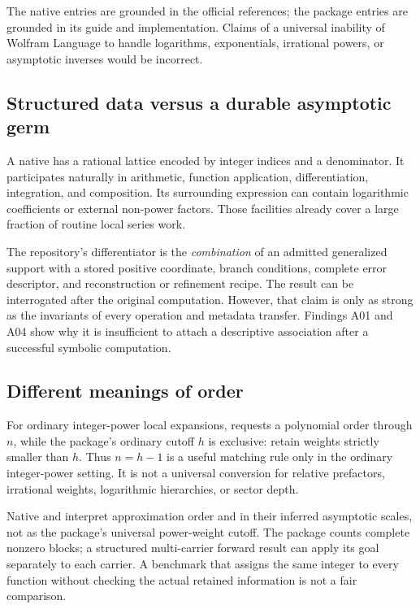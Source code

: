The native entries are grounded in the official references; the package entries are grounded in its guide and implementation. Claims of a universal inability of Wolfram Language to handle logarithms, exponentials, irrational powers, or asymptotic inverses would be incorrect.\cite{wl-series,wl-seriesdata,wl-inverse,wl-compose,wl-asymptotic,wl-solve,wl-discrete,guide,core,native,gamma,certificates}

\subsection{Structured data versus a durable asymptotic germ}
A native  has a rational lattice encoded by integer indices and a denominator. It participates naturally in arithmetic, function application, differentiation, integration, and composition. Its surrounding expression can contain logarithmic coefficients or external non-power factors. Those facilities already cover a large fraction of routine local series work.\cite{wl-seriesdata,wl-compose}

The repository's differentiator is the \emph{combination} of an admitted generalized support with a stored positive coordinate, branch conditions, complete error descriptor, and reconstruction or refinement recipe. The result can be interrogated after the original computation. However, that claim is only as strong as the invariants of every operation and metadata transfer. Findings A01 and A04 show why it is insufficient to attach a descriptive association after a successful symbolic computation.

\subsection{Different meanings of order}
For ordinary integer-power local expansions,  requests a polynomial order through $n$, while the package's ordinary cutoff $h$ is exclusive: retain weights strictly smaller than $h$. Thus $n=h-1$ is a useful matching rule only in the ordinary integer-power setting. It is not a universal conversion for relative prefactors, irrational weights, logarithmic hierarchies, or sector depth.\cite{wl-series,guide}

Native  and  interpret approximation order and  in their inferred asymptotic scales, not as the package's universal power-weight cutoff. The package counts complete nonzero blocks; a structured multi-carrier forward result can apply its goal separately to each carrier. A benchmark that assigns the same integer to every function without checking the actual retained information is not a fair comparison.\cite{wl-asymptotic,wl-solve,guide}

